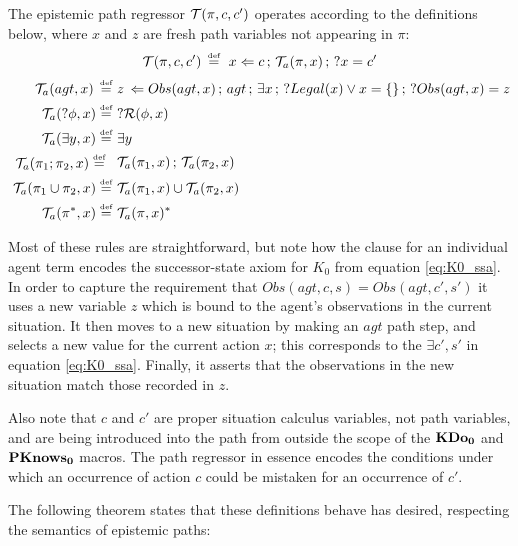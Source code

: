 \begin{defnL}
 The epistemic path regressor
$\mathcal{T}(\pi,c,c')$ operates according to the definitions below, where
$x$ and $z$ are fresh path variables not appearing in $\pi$:\label{def:EpistemicPathRegression}\[
\mathcal{T}(\pi,c,c')\,\stackrel{\mbox{\tiny def}}{=}\,\, x\Leftarrow c\,;\,\mathcal{T}_{a}(\pi,x)\,;\,?x=c'\]
 \begin{align*}
\mathcal{T}_{a}(agt,x)\,\stackrel{\mbox{\tiny def}}{=}\,\, & z\,\Leftarrow Obs(agt,x)\,;\, agt\,;\,\exists x\,;\,?Legal(x)\vee x=\{\}\,;\,?Obs(agt,x)=z\\
\mathcal{T}_{a}(?\phi,x)\stackrel{\mbox{\tiny def}}{=}\,\, & ?\mathcal{R}(\phi,x)\\
\mathcal{T}_{a}(\exists y,x)\stackrel{\mbox{\tiny def}}{=}\,\, & \exists y\\
\begin{array}{c}
\mathcal{T}_{a}(\pi_{1};\pi_{2},x)\stackrel{\mbox{\tiny def}}{=}\,\,\end{array} & \mathcal{T}_{a}(\pi_{1},x)\,;\,\mathcal{T}_{a}(\pi_{2},x)\\
\mathcal{T}_{a}(\pi_{1}\cup\pi_{2},x)\stackrel{\mbox{\tiny def}}{=}\,\, & \mathcal{T}_{a}(\pi_{1},x)\cup\mathcal{T}_{a}(\pi_{2},x)\\
\mathcal{T}_{a}(\pi^{*},x)\stackrel{\mbox{\tiny def}}{=}\,\, & \mathcal{T}_{a}(\pi,x)^{*}\end{align*}

\end{defnL}
Most of these rules are straightforward, but note how the clause for
an individual agent term encodes the successor-state axiom for $K_{0}$
from equation \eqref{eq:K0_ssa}. In order to capture the requirement
that $Obs(agt,c,s)=Obs(agt,c',s')$ it uses a new variable $z$ which
is bound to the agent's observations in the current situation. It
then moves to a new situation by making an $agt$ path step, and selects
a new value for the current action $x$; this corresponds to the $\exists c',s'$
in equation \eqref{eq:K0_ssa}. Finally, it asserts that the observations
in the new situation match those recorded in $z$.

Also note that $c$ and $c'$ are proper situation calculus variables,
not path variables, and are being introduced into the path from outside
the scope of the $\mathbf{KDo_{0}}$ and $\mathbf{PKnows_{0}}$ macros. The path regressor
in essence encodes the conditions under which an occurrence of action
$c$ could be mistaken for an occurrence of $c'$.

The following theorem states that these definitions behave has desired,
respecting the semantics of epistemic paths:

